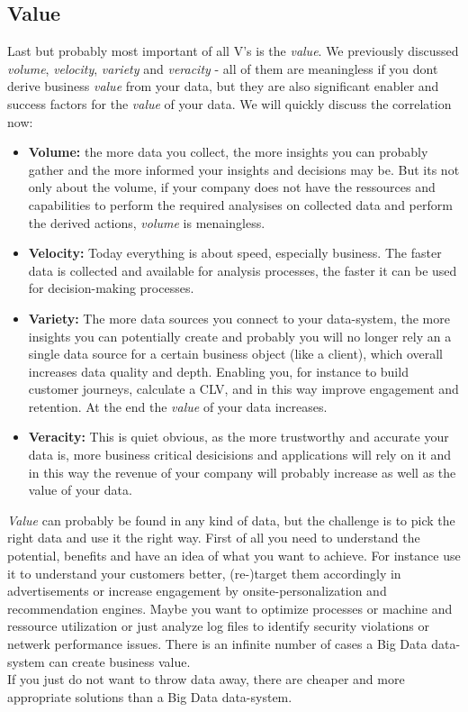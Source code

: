 \subsection{Value}
\label{bd_vs_value}
Last but probably most important of all V's is the \textit{value}. We previously discussed \textit{volume}, \textit{velocity}, \textit{variety} and \textit{veracity} - all of them are meaningless if you dont derive business \textit{value} from your data, but they are also significant enabler and success factors for the \textit{value} of your data. We will quickly discuss the correlation now: 
\begin{itemize}
	\item \textbf{Volume:} the more data you collect, the more insights you can probably gather and the more informed your insights and decisions may be. But its not only about the volume, if your company does not have the ressources and capabilities to perform the required analysises on collected data and perform the derived actions, \textit{volume} is menaingless.
	\item \textbf{Velocity:} Today everything is about speed, especially business. The faster data is collected and available for analysis processes, the faster it can be used for decision-making processes.
	\item \textbf{Variety:} The more data sources you connect to your data-system, the more insights you can potentially create and probably you will no longer rely an a single data source for a certain business object (like a client), which overall increases data quality and depth. Enabling you, for instance to build customer journeys, calculate a CLV, and in this way improve engagement and retention. At the end the \textit{value} of your data increases.
	\item \textbf{Veracity:} This is quiet obvious, as the more trustworthy and accurate your data is, more business critical desicisions and applications will rely on it and in this way the revenue of your company will probably increase as well as the value of your data.\\ 
\end{itemize}

\textit{Value} can probably be found in any kind of data, but the challenge is to pick the right data and use it the right way. First of all you need to understand the potential, benefits and have an idea of what you want to achieve. For instance use it to understand your customers better, (re-)target them accordingly in advertisements or increase engagement by onsite-personalization and recommendation engines. Maybe you want to optimize processes or machine and ressource utilization or just analyze log files to identify security violations or netwerk performance issues. There is an infinite number of cases a Big Data data-system can create business value. \\
If you just do not want to throw data away, there are cheaper and more appropriate solutions than a Big Data data-system. 

